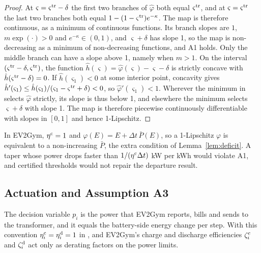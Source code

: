 \begin{proof}
At $\varsigma=\varsigma^{\mathrm{tr}}-\delta$ the first two branches of $\hat\varphi$ both equal $\varsigma^{\mathrm{tr}}$, and at $\varsigma=\varsigma^{\mathrm{tr}}$ the last two branches both equal $1-(1-\varsigma^{\mathrm{tr}})e^{-\kappa}$.
The map is therefore continuous, as a minimum of continuous functions.
Its branch slopes are $1$, $m\exp(\cdot)>0$ and $e^{-\kappa}\in(0,1)$, and $\varsigma+\delta$ has slope 1, so the map is non-decreasing as a minimum of non-decreasing functions, and A1 holds.
Only the middle branch can have a slope above 1, namely when $m>1$.
On the interval $(\varsigma^{\mathrm{tr}}-\delta,\varsigma^{\mathrm{tr}})$, the function $\hat h(\varsigma)=\hat\varphi(\varsigma)-\varsigma-\delta$ is strictly concave with $\hat h(\varsigma^{\mathrm{tr}}-\delta)=0$.
If $\hat h(\varsigma_1)<0$ at some interior point, concavity gives $\hat h'(\varsigma_1)\le \hat h(\varsigma_1)/(\varsigma_1-\varsigma^{\mathrm{tr}}+\delta)<0$, so $\hat\varphi'(\varsigma_1)<1$.
Wherever the minimum in  selects $\hat\varphi$ strictly, its slope is thus below 1, and elsewhere the minimum selects $\varsigma+\delta$ with slope 1.
The map is therefore piecewise continuously differentiable with slopes in $[0,1]$ and hence 1-Lipschitz.
\end{proof}

In EV2Gym, $\eta^{\mathrm c}=1$ and $\varphi(E)=E+\Delta t\,\bar P(E)$, so a 1-Lipschitz $\varphi$ is equivalent to a non-increasing $\bar P$, the extra condition of Lemma~\ref{lem:deficit}.
A taper whose power drops faster than $1/(\eta^{\mathrm c}\Delta t)$ kW per kWh would violate A1, and certified thresholds would not repair the departure result.

\subsection{Actuation and Assumption A3}\label{app:actuation}

The decision variable $p_i$ is the power that EV2Gym reports, bills and sends to the transformer, and it equals the battery-side energy change per step.
With this convention $\eta_i^{\mathrm c}=\eta_i^{\mathrm d}=1$ in , and EV2Gym's charge and discharge efficiencies $\zeta_i^{\mathrm c}$ and $\zeta_i^{\mathrm d}$ act only as derating factors on the power limits.

